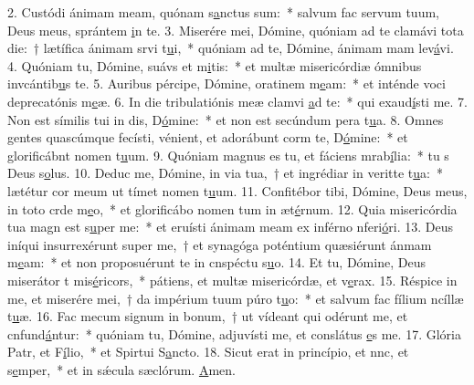 2. Custódi ánimam meam, quónam s\uline{a}nctus sum:~* salvum fac servum tuum, Deus meus, sprántem \uline{i}n te.
3. Miserére mei, Dómine, quóniam ad te clamávi tota die:~† lætífica ánimam srvi t\uline{u}i,~* quóniam ad te, Dómine, ánimam mam lev\uline{á}vi.
4. Quóniam tu, Dómine, suávs et m\uline{i}tis:~* et multæ misericórdiæ ómnibus invcántib\uline{u}s te.
5. Auribus pércipe, Dómine, oratinem m\uline{e}am:~* et inténde voci deprecatónis m\uline{e}æ.
6. In die tribulatiónis meæ clamvi \uline{a}d te:~* qui exaud\uline{í}sti me.
7. Non est símilis tui in dis, D\uline{ó}mine:~* et non est secúndum pera t\uline{u}a.
8. Omnes gentes quascúmque fecísti, vénient, et adorábunt corm te, D\uline{ó}mine:~* et glorificábnt nomen t\uline{u}um.
9. Quóniam magnus es tu, et fáciens mrab\uline{í}lia:~* tu s Deus s\uline{o}lus.
10. Deduc me, Dómine, in via tua,~† et ingrédiar in veritte t\uline{u}a:~* lætétur cor meum ut tímet nomen t\uline{u}um.
11. Confitébor tibi, Dómine, Deus meus, in toto crde m\uline{e}o,~* et glorificábo nomen tum in æt\uline{é}rnum.
12. Quia misericórdia tua magn est s\uline{u}per me:~* et eruísti ánimam meam ex inférno nferi\uline{ó}ri.
13. Deus iníqui insurrexérunt super me,~† et synagóga poténtium quæsiérunt ánmam m\uline{e}am:~* et non proposuérunt te in cnspéctu s\uline{u}o.
14. Et tu, Dómine, Deus miserátor t mis\uline{é}ricors,~* pátiens, et multæ misericórdæ, et v\uline{e}rax.
15. Réspice in me, et miserére mei,~† da impérium tuum púro t\uline{u}o:~* et salvum fac fílium ncíllæ t\uline{u}æ.
16. Fac mecum signum in bonum,~† ut vídeant qui odérunt me, et cnfund\uline{á}ntur:~* quóniam tu, Dómine, adjuvísti me, et conslátus \uline{e}s me.
17. Glória Patr, et F\uline{í}lio,~* et Spirtui S\uline{a}ncto.
18. Sicut erat in princípio, et nnc, et s\uline{e}mper,~* et in sǽcula sæclórum. \uline{A}men.
